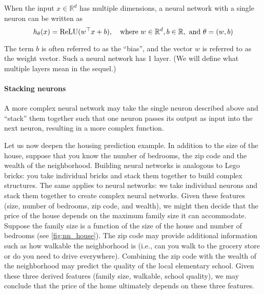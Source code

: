 When the input $x \in \mathbb{R}^d$ has multiple dimensions, a neural network with
a single neuron can be written as
\begin{equation}
    h_\theta(x) = \operatorname{ReLU}(w^\top x + b),\quad \text{where } w \in \mathbb{R}^d , b \in \mathbb{R}, \text{ and } \theta = (w,b)
\end{equation}

The term $b$ is often referred to as the ``bias'', and the vector $w$ is referred
to as the weight vector. Such a neural network has 1 layer. (We will define
what multiple layers mean in the sequel.)

\paragraph{Stacking neurons} A more complex neural network may take the single
neuron described above and ``stack'' them together such that one neuron
passes its output as input into the next neuron, resulting in a more complex
function.

Let us now deepen the housing prediction example. In addition to the size
of the house, suppose that you know the number of bedrooms, the zip code
and the wealth of the neighborhood. Building neural networks is analogous
to Lego bricks: you take individual bricks and stack them together to build
complex structures. The same applies to neural networks: we take individual
neurons and stack them together to create complex neural networks.
Given these features (size, number of bedrooms, zip code, and wealth),
we might then decide that the price of the house depends on the maximum
family size it can accommodate. Suppose the family size is a function of the
size of the house and number of bedrooms (see \cref{fig:nn_house}). The zip code may
provide additional information such as how walkable the neighborhood is
(i.e., can you walk to the grocery store or do you need to drive everywhere).
Combining the zip code with the wealth of the neighborhood may predict
the quality of the local elementary school. Given these three derived features
(family size, walkable, school quality), we may conclude that the price of the
home ultimately depends on these three features.


